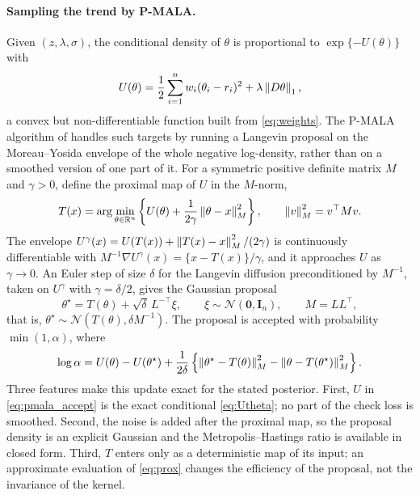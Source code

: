 \paragraph{Sampling the trend by P-MALA.} Given $(z, \lambda, \sigma)$, the conditional density of $\theta$ is proportional to $\exp\{-U(\theta)\}$ with
\begin{equation}
    U(\theta) = \frac{1}{2}\sum_{i=1}^n w_i (\theta_i - r_i)^2 + \lambda \left\lVert D\theta\right\rVert_1,
    \label{eq:Utheta}
\end{equation}
a convex but non-differentiable function built from \eqref{eq:weights}. The P-MALA algorithm of \citet{pereyra2016proximal} handles such targets by running a Langevin proposal on the Moreau--Yosida envelope of the whole negative log-density, rather than on a smoothed version of one part of it. For a symmetric positive definite matrix $M$ and $\gamma > 0$, define the proximal map of $U$ in the $M$-norm,
\begin{equation}
    T(x) = \arg\min_{\theta \in \mathbb{R}^n} \left\{ U(\theta) + \frac{1}{2\gamma}\left\lVert\theta - x\right\rVert_M^2 \right\}, \qquad \left\lVert v\right\rVert_M^2 = v^\top M v .
    \label{eq:prox}
\end{equation}
The envelope $U^\gamma(x) = U(T(x)) + \left\lVert T(x)-x\right\rVert_M^2/(2\gamma)$ is continuously differentiable with $M^{-1}\nabla U^\gamma(x) = \{x - T(x)\}/\gamma$, and it approaches $U$ as $\gamma \to 0$. An Euler step of size $\delta$ for the Langevin diffusion preconditioned by $M^{-1}$, taken on $U^\gamma$ with $\gamma = \delta/2$, gives the Gaussian proposal
\begin{equation}
    \theta^\star = T(\theta) + \sqrt{\delta}\, L^{-\top} \xi, \qquad \xi \sim \mathcal{N}(\mathbf{0}, \mathbf{I}_n), \qquad M = L L^\top,
    \label{eq:pmala_proposal}
\end{equation}
that is, $\theta^\star \sim \mathcal{N}(T(\theta), \delta M^{-1})$. The proposal is accepted with probability $\min(1,\alpha)$, where
\begin{equation}
    \log \alpha = U(\theta) - U(\theta^\star) + \frac{1}{2\delta}\left\{ \left\lVert\theta^\star - T(\theta)\right\rVert_M^2 - \left\lVert\theta - T(\theta^\star)\right\rVert_M^2 \right\}.
    \label{eq:pmala_accept}
\end{equation}
Three features make this update exact for the stated posterior. First, $U$ in \eqref{eq:pmala_accept} is the exact conditional \eqref{eq:Utheta}; no part of the check loss is smoothed. Second, the noise is added after the proximal map, so the proposal density is an explicit Gaussian and the Metropolis--Hastings ratio is available in closed form. Third, $T$ enters only as a deterministic map of its input; an approximate evaluation of \eqref{eq:prox} changes the efficiency of the proposal, not the invariance of the kernel.

